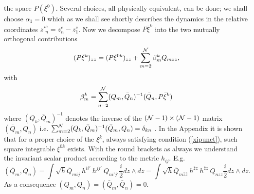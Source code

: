 \documentclass[a4paper,12pt]{article}
\begin{document}
the space $P(\xi^0)$. Several choices, all
physically equivalent, can 
be done; we shall choose 
$\alpha_1=0$ which as we shall see shortly describes the dynamics in
the relative coordinates ${z'}^c_n=z^c_n-z^c_1$.  
Now we decompose $P\bar\xi^{k}$ into the two mutually orthogonal
contributions
\begin{equation}\label{decomposition}
(P\bar\xi^{k})_{zz} = (P\bar\xi^{0k})_{zz}+\sum_{m=2}^{\cal
N}\beta^k_m Q_{mzz},   
\end{equation}
with
\begin{equation}
\beta^k_m=\sum_{n=2}^{\cal N}(Q_m,\bar Q_n)^{-1}(\bar Q_n, P\bar\xi^{k})
\end{equation}
where $(Q_k,\bar Q_m)^{-1}$ denotes the inverse of the $({\cal
N}-1)\times ({\cal N}-1)$ matrix $(\bar
Q_m,Q_n)$ i.e. $\sum_{m=2}^{\cal N}(Q_k,\bar Q_m)^{-1}(\bar
Q_m,Q_n) = \delta_{kn}$ .  In the Appendix it is shown
that for a proper choice of the $\xi^k$, always satisfying condition
(\ref{xipunct}), such square integrable 
$\xi^{0k}$ exists.  
With the round brackets as always we understand the invariant scalar
product according to the metric $h_{ij}$. E.g.
\begin{equation}
(\bar Q_m, Q_n)=\int \sqrt h \bar
Q_{mij}~h^{ii'}~h^{jj'}~Q_{ni'j'}\frac{i}{2}dz \wedge d\bar z=
\int \sqrt{h} \bar Q_{m\bar z\bar z}~h^{\bar z z}~h^{\bar
z z}~Q_{nzz}\frac{i}{2}dz \wedge d\bar z.
\end{equation}
As a consequence $(Q_m, Q_n)=(\bar Q_m, \bar Q_n)=0$.
\end{document}
